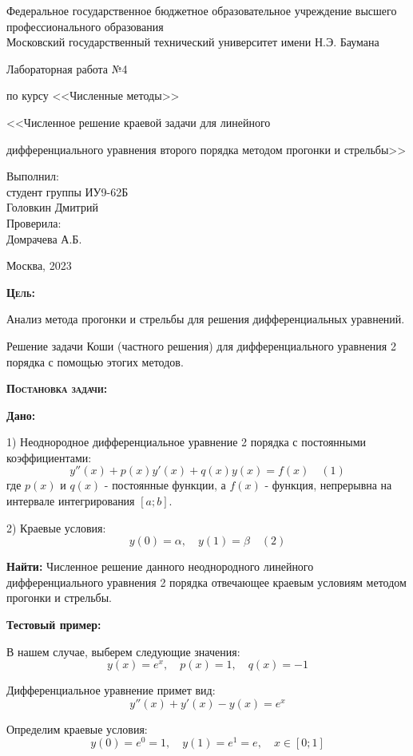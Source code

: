 \documentclass [12pt]{article}
\title{}
\date{}
\author{}
\begin{document}
\begin{titlepage}
\thispagestyle{empty}
\begin{center}
Федеральное государственное бюджетное образовательное учреждение высшего профессионального образования \\Московский государственный технический университет имени Н.Э. Баумана

\end{center}
\vfill
\centerline{\large{Лабораторная работа №4}}
\centerline{\large{по курсу <<Численные методы>>}}
\centerline{\large{<<Численное решение краевой задачи для линейного }}
\centerline{\large{дифференциального уравнения второго порядка методом прогонки и стрельбы>>}}
\vfill
\hfill\parbox{5cm} {
           Выполнил:\\
           студент группы ИУ9-62Б \hfill \\
           Головкин Дмитрий\hfill \medskip\\
           Проверила:\\
           Домрачева А.Б.\hfill
       }
\centerline{Москва, 2023}
\clearpage
\end{titlepage}

\textsc{\textbf{Цель:}} 

Анализ метода прогонки и стрельбы для решения дифференциальных уравнений. 

Решение задачи Коши (частного решения) для дифференциального уравнения 2 порядка с помощью этогих методов.

\textsc{\textbf{Постановка задачи:}}

\textbf{Дано:}  

1) Неоднородное дифференциальное уравнение 2 порядка с постоянными коэффициентами: $$y''(x)+p(x)y'(x)+q(x)y(x)=f(x) \quad(1)$$ где $p(x)$ и $q(x)$ - постоянные функции, а $f(x)$ - функция, непрерывна на интервале интегрирования $[a;b]$.

2) Краевые условия: $$ y(0)=\alpha,\quad y(1)=\beta \quad (2)$$

 \textbf{Найти:} Численное решение данного неоднородного линейного дифференциального уравнения 2 порядка отвечающее краевым условиям методом прогонки и стрельбы.

\textbf{Тестовый пример:} 

В нашем случае, выберем следующие значения:  $$y(x) = e^x, \quad p(x)=1, \quad q(x)=-1$$

Дифференциальное уравнение примет вид:  $$y''(x)+y'(x)-y(x)=e^x$$

Определим краевые условия: $$ y(0)=e^0=1, \quad y(1)=e^1=e, \quad x \in [0;1] $$
\end{document}
